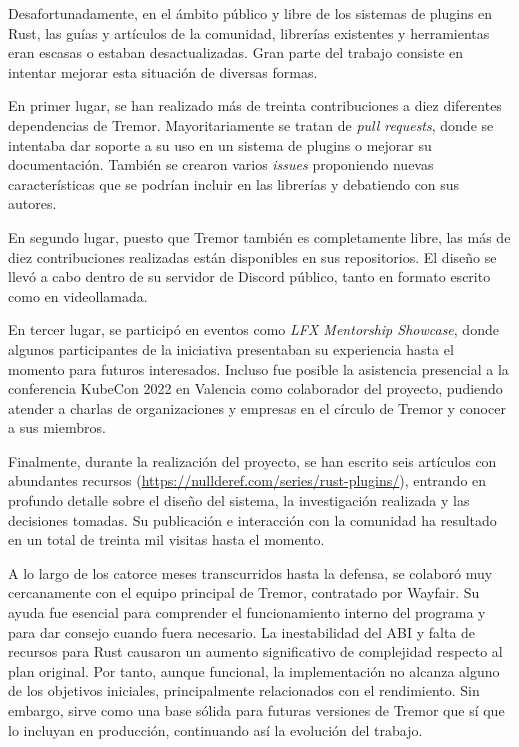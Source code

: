 \documentclass[a4paper,12pt,twoside,hidelinks,openright]{article}
\begin{document}
Desafortunadamente, en el ámbito público y libre de los sistemas de plugins en
Rust, las guías y artículos de la comunidad, librerías existentes y herramientas
eran escasas o estaban desactualizadas. Gran parte del trabajo consiste en
intentar mejorar esta situación de diversas formas.

En primer lugar, se han realizado más de treinta contribuciones a diez
diferentes dependencias de Tremor. Mayoritariamente se tratan de \emph{pull
requests}, donde se intentaba dar soporte a su uso en un sistema de plugins o
mejorar su documentación. También se crearon varios \emph{issues} proponiendo
nuevas características que se podrían incluir en las librerías y debatiendo con
sus autores.

En segundo lugar, puesto que Tremor también es completamente libre, las más de
diez contribuciones realizadas están disponibles en sus repositorios. El diseño
se llevó a cabo dentro de su servidor de Discord público, tanto en formato
escrito como en videollamada.

En tercer lugar, se participó en eventos como \emph{LFX Mentorship Showcase},
donde algunos participantes de la iniciativa presentaban su experiencia hasta el
momento para futuros interesados. Incluso fue posible la asistencia presencial a
la conferencia KubeCon 2022 en Valencia como colaborador del proyecto, pudiendo
atender a charlas de organizaciones y empresas en el círculo de Tremor y conocer
a sus miembros.

Finalmente, durante la realización del proyecto, se han escrito seis artículos
con abundantes recursos (\url{https://nullderef.com/series/rust-plugins/}),
entrando en profundo detalle sobre el diseño del sistema, la investigación
realizada y las decisiones tomadas. Su publicación e interacción con la
comunidad ha resultado en un total de treinta mil visitas hasta el momento.

A lo largo de los catorce meses transcurridos hasta la defensa, se colaboró muy
cercanamente con el equipo principal de Tremor, contratado por Wayfair. Su ayuda
fue esencial para comprender el funcionamiento interno del programa y para dar
consejo cuando fuera necesario. La inestabilidad del ABI y falta de recursos
para Rust causaron un aumento significativo de complejidad respecto al plan
original. Por tanto, aunque funcional, la implementación no alcanza alguno de
los objetivos iniciales, principalmente relacionados con el rendimiento. Sin
embargo, sirve como una base sólida para futuras versiones de Tremor que sí que
lo incluyan en producción, continuando así la evolución del trabajo.

\endgroup
\end{document}
